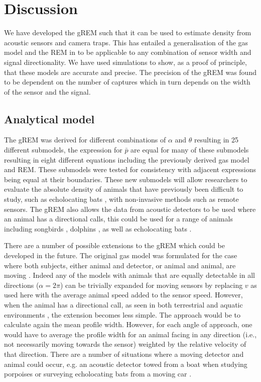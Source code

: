 \documentclass[a4paper,10pt,reqno,oneside]{amsart}
\begin{document}
                  
                  
\section*{Discussion}

We have developed the gREM such that it can be used to estimate density from acoustic sensors and camera traps. This has entailed a generalisation of the gas model and the REM in \citet{rowcliffe2008estimating} to be applicable to any combination of sensor width and signal directionality. We have used simulations to show, as a proof of principle, that these models are accurate and precise. The precision of the gREM was found to be dependent on the number of captures which in turn depends on the width of the sensor and the signal.

\subsection*{Analytical model}
The gREM was derived for different combinations of $\alpha$ and $\theta$ resulting in 25 different submodels, the expression for $\bar{p}$ are equal for many of these submodels resulting in eight different equations including the previously derived gas model and REM. These submodels were tested for consistency with adjacent expressions being equal at their boundaries. These new submodels will allow researchers to evaluate the absolute density of animals that have previously been difficult to study, such as echolocating bats \citep{clement2013estimating}, with non-invasive methods such as remote sensors. The gREM also allows the data from acoustic detectors to be used where an animal has a directional calls, this could be used for a range of animals including songbirds \citep{blumstein2011acoustic}, dolphins \citep{lammers2003directionality}, as well as echolocating bats \citep{walters2013challenges}. 

There are a number of possible extensions to the gREM which could be developed in the future. The original gas model was formulated for the case where both subjects, either animal and detector, or animal and animal, are moving \citep{Hutchinson_Waser_2007}. Indeed any of the models with animals that are equally detectable in all directions ($\alpha = 2\pi$) can be trivially expanded for moving sensors by replacing $v$ as used here with the average animal speed added to the sensor speed. However, when the animal has a directional call, as seen in both terrestrial and aquatic environments \citep{lammers2003directionality,blumstein2011acoustic}, the extension becomes less simple. The approach would be to calculate again the mean profile width. However, for each angle of approach, one would have to average the profile width for an animal facing in any direction (i.e., not necessarily moving towards the sensor) weighted by the relative velocity of that direction. There are a number of situations where a moving detector and animal could occur, e.g. an acoustic detector towed from a boat when studying porpoises \citep{kimura2014acoustic} or surveying echolocating bats from a moving car \citep{ahlen1999use, jones2011indicator}. 
\end{document}
